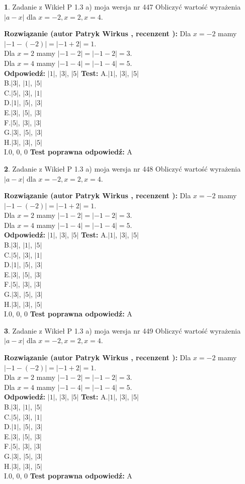 \documentclass[12pt, a4paper]{article}
\theoremstyle{definition} %
\newtheorem{zad}{}
\newcommand{\zadStart}[1]{\begin{zad}#1\newline}
\newcommand{\zadStop}{\end{zad}}
\newcommand{\rozwStart}[2]{\noindent \textbf{Rozwiązanie (autor #1 , recenzent #2): }\newline}
\newcommand{\rozwStop}{\newline}
\newcommand{\odpStart}{\noindent \textbf{Odpowiedź:}\newline}
\newcommand{\odpStop}{\newline}
\newcommand{\testStart}{\noindent \textbf{Test:}\newline}
\newcommand{\testStop}{\newline}
\newcommand{\kluczStart}{\noindent \textbf{Test poprawna odpowiedź:}\newline}
\newcommand{\kluczStop}{\newline}
\begin{document}
\zadStart{Zadanie z Wikieł P 1.3 a) moja wersja nr 447}
Obliczyć wartość wyrażenia $|a - x|$ dla $x=-2,x=2,x=4$.
\zadStop
\rozwStart{Patryk Wirkus}{}
Dla $x = -2$ mamy $|-1 - (-2)| = |-1 + 2| = 1$.\\
Dla $x = 2$ mamy $|-1 - 2| = |-1 - 2| = 3$.\\
Dla $x = 4$ mamy $|-1 - 4| = |-1 - 4| = 5$.\\
\rozwStop
\odpStart
$|1|$, $|3|$, $|5|$
\odpStop
\testStart
A.$|1|$, $|3|$, $|5|$\\
B.$|3|$, $|1|$, $|5|$\\
C.$|5|$, $|3|$, $|1|$\\
D.$|1|$, $|5|$, $|3|$\\
E.$|3|$, $|5|$, $|3|$\\
F.$|5|$, $|3|$, $|3|$\\
G.$|3|$, $|5|$, $|3|$\\
H.$|3|$, $|3|$, $|5|$\\
I.$0$, $0$, $0$
\testStop
\kluczStart
A
\kluczStop



\zadStart{Zadanie z Wikieł P 1.3 a) moja wersja nr 448}
Obliczyć wartość wyrażenia $|a - x|$ dla $x=-2,x=2,x=4$.
\zadStop
\rozwStart{Patryk Wirkus}{}
Dla $x = -2$ mamy $|-1 - (-2)| = |-1 + 2| = 1$.\\
Dla $x = 2$ mamy $|-1 - 2| = |-1 - 2| = 3$.\\
Dla $x = 4$ mamy $|-1 - 4| = |-1 - 4| = 5$.\\
\rozwStop
\odpStart
$|1|$, $|3|$, $|5|$
\odpStop
\testStart
A.$|1|$, $|3|$, $|5|$\\
B.$|3|$, $|1|$, $|5|$\\
C.$|5|$, $|3|$, $|1|$\\
D.$|1|$, $|5|$, $|3|$\\
E.$|3|$, $|5|$, $|3|$\\
F.$|5|$, $|3|$, $|3|$\\
G.$|3|$, $|5|$, $|3|$\\
H.$|3|$, $|3|$, $|5|$\\
I.$0$, $0$, $0$
\testStop
\kluczStart
A
\kluczStop



\zadStart{Zadanie z Wikieł P 1.3 a) moja wersja nr 449}
Obliczyć wartość wyrażenia $|a - x|$ dla $x=-2,x=2,x=4$.
\zadStop
\rozwStart{Patryk Wirkus}{}
Dla $x = -2$ mamy $|-1 - (-2)| = |-1 + 2| = 1$.\\
Dla $x = 2$ mamy $|-1 - 2| = |-1 - 2| = 3$.\\
Dla $x = 4$ mamy $|-1 - 4| = |-1 - 4| = 5$.\\
\rozwStop
\odpStart
$|1|$, $|3|$, $|5|$
\odpStop
\testStart
A.$|1|$, $|3|$, $|5|$\\
B.$|3|$, $|1|$, $|5|$\\
C.$|5|$, $|3|$, $|1|$\\
D.$|1|$, $|5|$, $|3|$\\
E.$|3|$, $|5|$, $|3|$\\
F.$|5|$, $|3|$, $|3|$\\
G.$|3|$, $|5|$, $|3|$\\
H.$|3|$, $|3|$, $|5|$\\
I.$0$, $0$, $0$
\testStop
\kluczStart
A
\kluczStop
\end{document}
